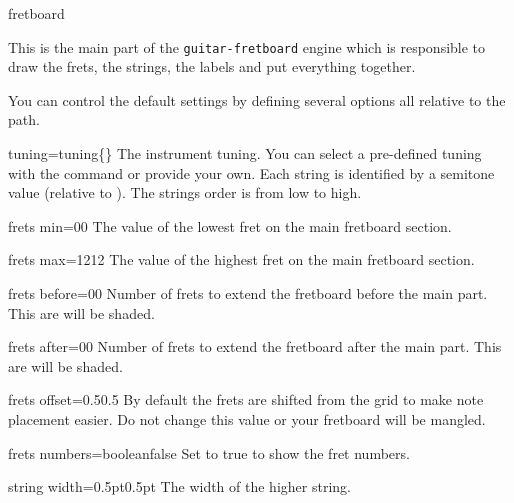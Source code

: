 \documentclass[a4paper]{article}
\newcommand{\pkg}[1]{\texttt{#1}}
\begin{document}
\begin{docEnvironment}{fretboard}{}

  This is the main part of the \pkg{guitar-fretboard} engine which is
  responsible to draw the frets, the strings, the labels and put everything
  together.

  You can control the default settings by defining several options all
  relative to the  path.

  \begin{docKey}[fb][]{tuning}{=tuning}{\{\}}
    The instrument tuning. You can select a pre-defined tuning with the
     command or provide your own. Each string is identified by
    a semitone value (relative to \pC). The strings order is from low to
    high.
  \end{docKey}

  \begin{docKey}[fb][]{frets min}{=0}{0}
    The value of the lowest fret on the main fretboard section.
  \end{docKey}

  \begin{docKey}[fb][]{frets max}{=12}{12}
    The value of the highest fret on the main fretboard section.
  \end{docKey}

  \begin{docKey}[fb][]{frets before}{=0}{0}
    Number of frets to extend the fretboard before the main part. This are
    will be shaded.
  \end{docKey}

  \begin{docKey}[fb][]{frets after}{=0}{0}
    Number of frets to extend the fretboard after the main part. This are
    will be shaded.
  \end{docKey}

  \begin{docKey}[fb][]{frets offset}{=0.5}{0.5}
    By default the frets are shifted from the grid to make note placement
    easier. Do not change this value or your fretboard will be mangled.
  \end{docKey}

  \begin{docKey}[fb][]{frets numbers}{=boolean}{false}
    Set to true to show the fret numbers.
  \end{docKey}

  \begin{docKey}[fb][]{string width}{=0.5pt}{0.5pt}
    The width of the higher string.
  \end{docKey}


\end{docEnvironment}
\end{document}
